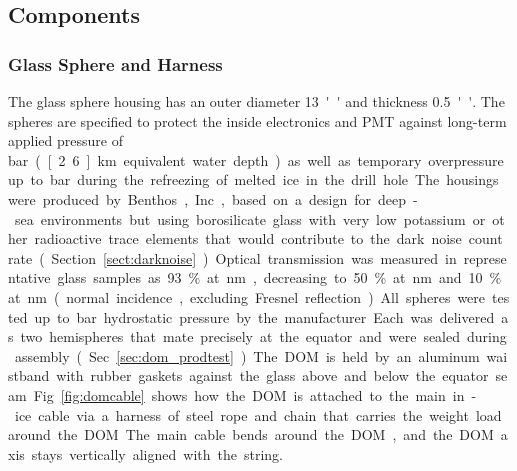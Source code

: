 \subsection{\label{sec:dom_components}Components}

\subsubsection{\label{sec:sphere}Glass Sphere and Harness}

The glass sphere housing has an outer diameter \SI{13}{''} and thickness \SI{0.5}{''}.
The spheres are specified to protect the inside electronics and PMT against long-term applied pressure of 
\unit[250]bar (\unit[2.6]km equivalent water depth)
as well as temporary overpressure up to \unit[690]bar during the refreezing of melted ice in the drill hole.
The housings were produced by Benthos, Inc., based on a design for deep-sea
environments but using borosilicate glass
with very low potassium or other radioactive trace elements that would contribute to the dark noise
count rate (Section~\ref{sect:darknoise}).  
Optical transmission was measured in representative glass samples as 93\% at \unit[400]nm,
decreasing to 50\% at \unit[340]nm and 10\% at \unit[315]nm (normal incidence, excluding Fresnel reflection).


All spheres were tested up to \unit[690]bar hydrostatic pressure by the manufacturer.
Each was delivered as two hemispheres that mate precisely at the equator
and were sealed during assembly (Sec.~\ref{sec:dom_prodtest}).  The DOM
is held by an aluminum waistband with rubber gaskets against 
the glass above and below the equator seam. 
Fig.~\ref{fig:domcable} shows how the DOM is attached to the main in-ice cable via a harness
of steel rope and chain that carries the weight load around the DOM.
The main cable bends around the DOM, and the DOM axis stays vertically aligned with the string.

